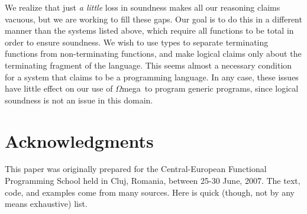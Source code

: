 \documentclass[11pt,twoside,A4]{llncs}
\newcommand{\om}{\emph{$\Omega$}mega}
\begin{document}
We realize that just {\em a little} loss in soundness makes all
our reasoning claims vacuous, but we are working to fill
these gaps.  Our goal is to do this in a different manner
than the systems listed above, which require all functions to be total
in order to ensure soundness. We wish to use types to separate
terminating functions from non-terminating functions, and make
logical claims only about the terminating fragment of the language.
This seems almost a necessary condition for a system that
claims to be a programming language. In any case, these issues
have little effect on our use of \om\ to program generic programs,
since logical soundness is not an issue in this domain.


\section{Acknowledgments}

This paper was originally prepared for the 
Central-European Functional Programming School held in
Cluj,  Romania, between 25-30 June, 2007.
The text, code, and examples come from many sources. Here is quick
(though, not by any means exhaustive) list.
\end{document}
